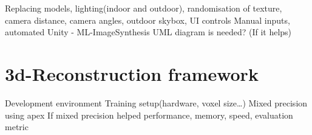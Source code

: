 Replacing models, lighting(indoor and outdoor), randomisation of texture, camera distance, camera angles, outdoor skybox,
UI controls
Manual inputs, automated
Unity - ML-ImageSynthesis
UML diagram is needed? (If it helps)

\section{3d-Reconstruction framework}\label{s:3D-Reconstruction framework}


Development environment
Training setup(hardware, voxel size…)
Mixed precision using apex
If mixed precision helped performance, memory, speed, evaluation metric


